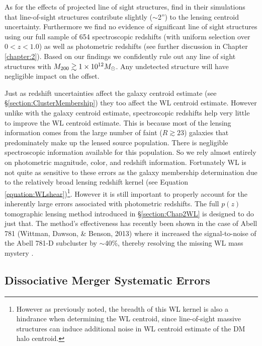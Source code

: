 As for the effects of projected line of sight structures, \citet{Dietrich:2011gs} find in their simulations that line-of-sight structures contribute slightly ($\sim$2'') to the lensing centroid uncertainty.
Furthermore we find no evidence of significant line of sight structures using our full sample of 654 spectroscopic redshifts (with uniform selection over $0<z<1.0$) as well as photometric redshifts (see further discussion in Chapter \ref{chapter:2}). 
Based on our findings we confidently rule out any line of sight structures with $M_{\rm 200}\gtrsim1\times10^{12} M_\odot$.
Any undetected structure will have negligible impact on the offset.

Just as redshift uncertainties affect the galaxy centroid estimate (see \S\ref{section:ClusterMembership}) they too affect the WL centroid estimate.
However unlike with the galaxy centroid estimate, spectroscopic redshifts help very little to improve the WL centroid estimate.
This is because most of the lensing information comes from the large number of faint ($R\gtrsim23$) galaxies that predominately make up the lensed source population.
There is negligible spectroscopic information available for this population. 
So we rely almost entirely on photometric magnitude, color, and redshift information.
Fortunately WL is not quite as sensitive to these errors as the galaxy membership determination due to the relatively broad lensing redshift kernel (see Equation \ref{equation:WLshear})\footnote{However as previously noted, the breadth of this WL kernel is also a hindrance when determining the WL centroid, since line-of-sight massive structures can induce additional noise in WL centroid estimate of the DM halo centroid.}.
However it is still important to properly account for the inherently large errors associated with photometric redshifts.
The full $p(z)$ tomographic lensing method introduced in \S\ref{section:Chap2WL} is designed to do just that.
The method's effectiveness has recently been shown in the case of Abell 781 (Wittman, Dawson, \& Benson, 2013) where it increased the signal-to-noise of the Abell 781-D subcluster by $\sim$40\%, thereby resolving the missing WL mass mystery \citep{Cook:2012ka}.


\subsection{Dissociative Merger Systematic Errors}\label{section:MergerSysError}


